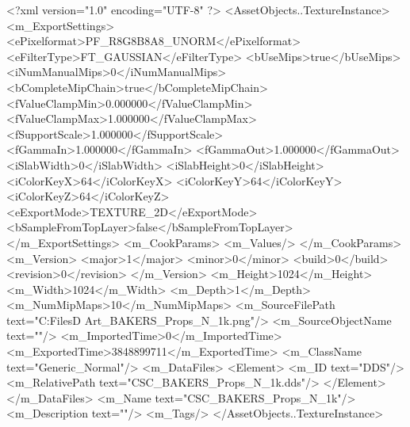 <?xml version="1.0" encoding="UTF-8" ?>
<AssetObjects..TextureInstance>
	<m_ExportSettings>
		<ePixelformat>PF_R8G8B8A8_UNORM</ePixelformat>
		<eFilterType>FT_GAUSSIAN</eFilterType>
		<bUseMips>true</bUseMips>
		<iNumManualMips>0</iNumManualMips>
		<bCompleteMipChain>true</bCompleteMipChain>
		<fValueClampMin>0.000000</fValueClampMin>
		<fValueClampMax>1.000000</fValueClampMax>
		<fSupportScale>1.000000</fSupportScale>
		<fGammaIn>1.000000</fGammaIn>
		<fGammaOut>1.000000</fGammaOut>
		<iSlabWidth>0</iSlabWidth>
		<iSlabHeight>0</iSlabHeight>
		<iColorKeyX>64</iColorKeyX>
		<iColorKeyY>64</iColorKeyY>
		<iColorKeyZ>64</iColorKeyZ>
		<eExportMode>TEXTURE_2D</eExportMode>
		<bSampleFromTopLayer>false</bSampleFromTopLayer>
	</m_ExportSettings>
	<m_CookParams>
		<m_Values/>
	</m_CookParams>
	<m_Version>
		<major>1</major>
		<minor>0</minor>
		<build>0</build>
		<revision>0</revision>
	</m_Version>
	<m_Height>1024</m_Height>
	<m_Width>1024</m_Width>
	<m_Depth>1</m_Depth>
	<m_NumMipMaps>10</m_NumMipMaps>
	<m_SourceFilePath text="C:\Users\Shadow\Desktop\Working Files\3D Art\Textures\CSC_BAKERS_Props_N_1k.png"/>
	<m_SourceObjectName text=""/>
	<m_ImportedTime>0</m_ImportedTime>
	<m_ExportedTime>3848899711</m_ExportedTime>
	<m_ClassName text="Generic_Normal"/>
	<m_DataFiles>
		<Element>
			<m_ID text="DDS"/>
			<m_RelativePath text="CSC_BAKERS_Props_N_1k.dds"/>
		</Element>
	</m_DataFiles>
	<m_Name text="CSC_BAKERS_Props_N_1k"/>
	<m_Description text=""/>
	<m_Tags/>
</AssetObjects..TextureInstance>

